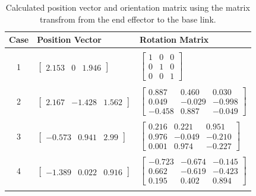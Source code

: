\documentclass[a4paper]{article}
\begin{document}
\begin{table}[h]
	\centering
	\caption{Calculated position vector and orientation matrix using the matrix transfrom from the end effector to the base link.}
	\small
	\begin{tabular}{cll}
		\toprule
		\textbf{Case} & \textbf{Position Vector} & \textbf{Rotation Matrix}\\
		\midrule
		& & \\
		1 & $\begin{bmatrix}2.153 & 0 & 1.946\end{bmatrix}$ & $\begin{bmatrix}1 & 0 & 0\\0 & 1 & 0\\0 & 0 & 1\end{bmatrix}$\\
		& & \\
		2 & $\begin{bmatrix}2.167 & -1.428 & 1.562\end{bmatrix}$ & $\begin{bmatrix}0.887 & 0.460 & 0.030\\0.049 & -0.029 & -0.998\\-0.458 & 0.887 & -0.049\end{bmatrix}$\\
		& & \\
		3 & $\begin{bmatrix}-0.573 & 0.941 & 2.99\end{bmatrix}$ & $\begin{bmatrix}0.216 & 0.221 & 0.951\\0.976 & -0.049 & -0.210\\0.001 & 0.974 & -0.227\end{bmatrix}$\\
		& & \\
		4 & $\begin{bmatrix}-1.389 & 0.022 & 0.916\end{bmatrix}$ & $\begin{bmatrix}-0.723 & -0.674 & -0.145\\0.662 & -0.619 & -0.423\\0.195 & 0.402 & 0.894\end{bmatrix}$\\
		& & \\
		\bottomrule
	\end{tabular}
\end{table}

\newpage
\end{document}

